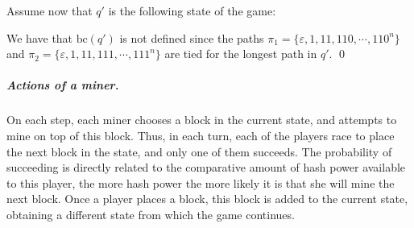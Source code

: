 \documentclass[a4paper,english,cleveref, autoref,numberwithinsect]{lipics-v2019}
\newcommand{\marcelo}[1]{{\color{red} {\bf Marcelo: #1}}}
\newcommand{\etienne}[1]{{\color{blue} {\bf Etienne: #1}}}
\newcommand{\juan}[1]{{\textcolor{violet} {\bf Juan: #1}}}
\newcommand{\bchain}{\text{bc}}
\begin{document}
\begin{example}
	Assume now that $q'$ is the following state of the game:
	\begin{center}
\end{center}
\vspace{-10pt}
We have that $\bchain(q')$ is not defined since the paths $\pi_1 = \{\varepsilon, 1, 11, 110, \cdots, 110^n\}$ and $\pi_2 = \{\varepsilon, 1, 11, 111, \cdots, 111^n\}$ are tied for the longest path in $q'$. \qed
\end{example}



\subparagraph*{Actions of a miner.} %
On each step, each miner
chooses a block in the current state, and attempts to mine on top of this block. Thus, in each turn, each of the players race to place the next block in the state, and only one of them succeeds. The probability of succeeding is directly related to the comparative amount of hash power available to this player, the more hash power the more likely it is that she will mine the next block. %
Once a player places a block, this block is added to the current state, obtaining a different state from which the game continues.
\end{document}
